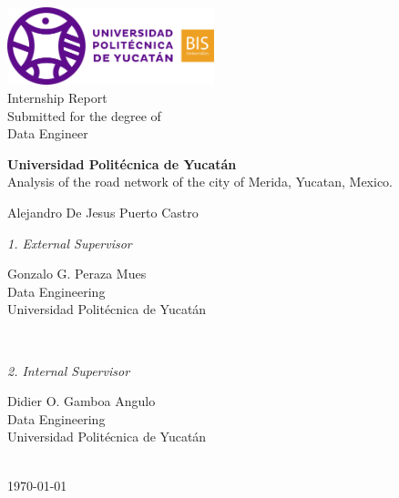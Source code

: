 \begin{titlepage}

	\centering

	\includegraphics[width=6cm]{Figures/logo} \\[2mm]
	\textsf{Internship Report} \\
	\textsf{Submitted for the degree of} \\
	\textsf{Data Engineer} \\

	\vfill

	{\LARGE \textbf{Universidad Politécnica de Yucatán} \\
	\LARGE  Analysis of the road network of the city of Merida, Yucatan, Mexico.  \\[10mm]}

	{\Large Alejandro De Jesus Puerto Castro} \\

	\vfill
	\begin{minipage}[t]{.27\textwidth}
		\raggedleft
		\textit{1. External Supervisor}
	\end{minipage}
	\hspace*{15pt}
	\begin{minipage}[t]{.65\textwidth}
		{\Large Gonzalo G. Peraza Mues} \\
	  	{\small Data Engineering} \\[-1mm]
		{\small Universidad Politécnica de Yucatán}
	\end{minipage} \\[5mm]
	\begin{minipage}[t]{.27\textwidth}
		\raggedleft
		\textit{2. Internal Supervisor}
	\end{minipage}
	\hspace*{15pt}
	\begin{minipage}[t]{.65\textwidth}
		{\Large Didier O. Gamboa Angulo} \\
	  	{\small Data Engineering} \\[-1mm]
		{\small Universidad Politécnica de Yucatán}
	\end{minipage} \\[10mm]

	\today \\

\end{titlepage}
